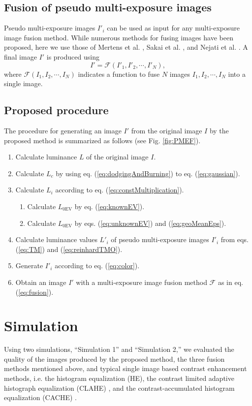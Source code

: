 \documentclass[paper]{ieice}
\begin{document}
\subsection{Fusion of pseudo multi-exposure images}
  Pseudo multi-exposure images $I'_i$ can be used as input
  for any multi-exposure image fusion method.
  While numerous methods for fusing images have been proposed,
  here we use those of Mertens et al. \cite{mertens2009exposure},
  Sakai et al. \cite{sakai2015hybrid}, and Nejati et al. \cite{nejati2017fast}.
  A final image $I'$ is produced using
  \begin{equation}
    I' = \mathscr{F}(I'_1, I'_2, \cdots, I'_N),
    \label{eq:fusion}
  \end{equation}
  where $\mathscr{F}(I_1, I_2, \cdots, I_N)$ indicates a function to fuse $N$ images
  $I_1, I_2, \cdots, I_N$ into a single image.
%
\subsection{Proposed procedure}
  The procedure for generating an image $I'$ from the original image $I$
  by the proposed method is summarized as follows (see Fig. \ref{fig:PMEF}).
  \begin{enumerate}[nosep]
    \item Calculate luminance $L$ of the original image $I$.
    \item Calculate $L_c$ by using eq. (\ref{eq:dodgingAndBurning}) to eq. (\ref{eq:gaussian}).
    \item Calculate $L_i$ according to eq. (\ref{eq:constMultiplication}).
      \begin{enumerate}[label=Approach \Alph*.,leftmargin=*]
        \item Calculate $L_{0\mathrm{EV}}$ by eq. (\ref{eq:knownEV}).
        \item Calculate $L_{0\mathrm{EV}}$ by
          eqs. (\ref{eq:unknownEV}) and (\ref{eq:geoMeanEps}).
      \end{enumerate}
    \item Calculate luminance values $L'_i$ of pseudo multi-exposure images $I'_i$
      from eqs. (\ref{eq:TM}) and (\ref{eq:reinhardTMO}).
    \item Generate $I'_i$ according to eq. (\ref{eq:color}).
    \item Obtain an image $I'$ with a multi-exposure image fusion method $\mathscr{F}$
      as in eq. (\ref{eq:fusion}).
  \end{enumerate}
%
\section{Simulation}
  Using two simulations, ``Simulation 1'' and ``Simulation 2,''
  we evaluated the quality of the images produced by the proposed method,
  the three fusion methods mentioned above,
  and typical single image based contrast enhancement methods, i.e.
  the histogram equalization (HE),
  the contrast limited adaptive histograph equalization (CLAHE) \cite{zuiderveld1994contrast},
  and the contrast-accumulated histogram equalization (CACHE) \cite{wu2017contrast}.
%
\end{document}
